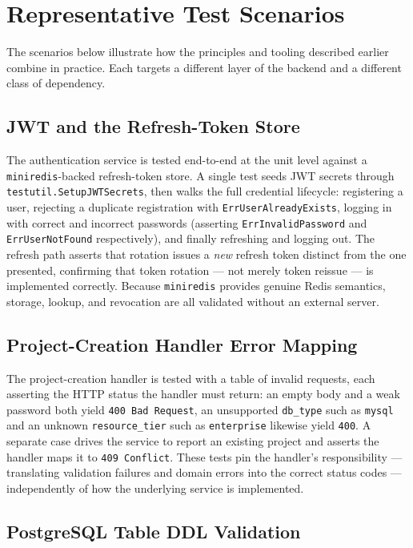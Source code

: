 \section{Representative Test Scenarios}
\label{sec:representative_tests}

The scenarios below illustrate how the principles and tooling described earlier combine in practice. Each targets a different layer of the backend and a different class of dependency.

\subsection{JWT and the Refresh-Token Store}

The authentication service is tested end-to-end at the unit level against a \texttt{miniredis}-backed refresh-token store. A single test seeds JWT secrets through \texttt{testutil.SetupJWTSecrets}, then walks the full credential lifecycle: registering a user, rejecting a duplicate registration with \texttt{ErrUserAlreadyExists}, logging in with correct and incorrect passwords (asserting \texttt{ErrInvalidPassword} and \texttt{ErrUserNotFound} respectively), and finally refreshing and logging out. The refresh path asserts that rotation issues a \emph{new} refresh token distinct from the one presented, confirming that token rotation --- not merely token reissue --- is implemented correctly. Because \texttt{miniredis} provides genuine Redis semantics, storage, lookup, and revocation are all validated without an external server.

\subsection{Project-Creation Handler Error Mapping}

The project-creation handler is tested with a table of invalid requests, each asserting the HTTP status the handler must return: an empty body and a weak password both yield \texttt{400 Bad Request}, an unsupported \texttt{db\_type} such as \texttt{mysql} and an unknown \texttt{resource\_tier} such as \texttt{enterprise} likewise yield \texttt{400}. A separate case drives the service to report an existing project and asserts the handler maps it to \texttt{409 Conflict}. These tests pin the handler's responsibility --- translating validation failures and domain errors into the correct status codes --- independently of how the underlying service is implemented.

\subsection{PostgreSQL Table DDL Validation}

